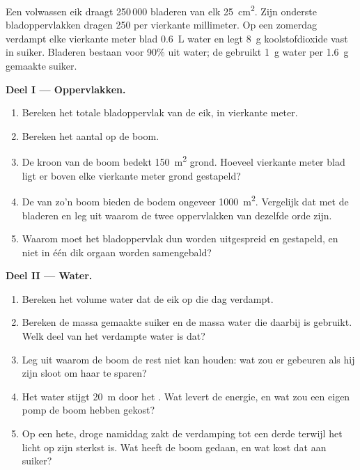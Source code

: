 \begin{problem}
\label{pb:g12:plant-rooted-life:1}
Een volwassen eik draagt 250\,000 bladeren van elk \qty{25}{cm^2}. Zijn
onderste bladoppervlakken dragen 250  per vierkante
millimeter. Op een zomerdag verdampt elke vierkante meter blad
\qty{0.6}{L} water en legt \qty{8}{g} koolstofdioxide vast in suiker.
Bladeren bestaan voor 90\% uit water; de  gebruikt \qty{1}{g}
water per \qty{1.6}{g} gemaakte suiker.

\medskip
\noindent\textbf{Deel I --- Oppervlakken.}
\begin{enumerate}
  \item Bereken het totale bladoppervlak van de eik, in vierkante meter.
  \item Bereken het aantal  op de boom.
  \item De kroon van de boom bedekt \qty{150}{m^2} grond. Hoeveel
        vierkante meter blad ligt er boven elke vierkante meter grond
        gestapeld?
  \item De  van zo'n boom bieden de bodem ongeveer
        \qty{1000}{m^2}. Vergelijk dat met de bladeren en leg uit waarom
        de twee oppervlakken van dezelfde orde zijn.
  \item Waarom moet het bladoppervlak dun worden uitgespreid en
        gestapeld, en niet in één dik orgaan worden samengebald?
\end{enumerate}

\medskip
\noindent\textbf{Deel II --- Water.}
\begin{enumerate}[resume]
  \item Bereken het volume water dat de eik op die dag verdampt.
  \item Bereken de massa gemaakte suiker en de massa water die daarbij is
        gebruikt. Welk deel van het verdampte water is dat?
  \item Leg uit waarom de boom de rest niet kan houden: wat zou er
        gebeuren als hij zijn  sloot om haar te sparen?
  \item Het water stijgt \qty{20}{m} door het . Wat levert de
        energie, en wat zou een eigen pomp de boom hebben gekost?
  \item Op een hete, droge namiddag zakt de verdamping tot een derde
        terwijl het licht op zijn sterkst is. Wat heeft de boom gedaan,
        en wat kost dat aan suiker?
\end{enumerate}


\end{problem}
